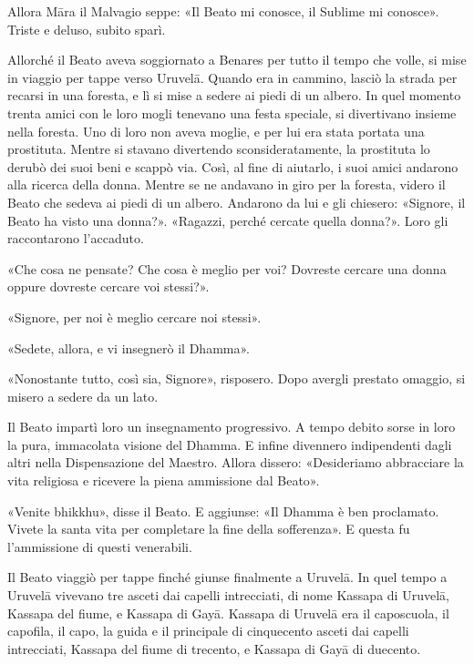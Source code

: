 Allora Māra il Malvagio seppe: «Il Beato mi conosce, il Sublime mi conosce».
Triste e deluso, subito sparì.

Allorché il Beato aveva soggiornato a Benares per tutto il tempo che volle, si
mise in viaggio per tappe verso Uruvelā. Quando era in cammino, lasciò la strada
per recarsi in una foresta, e lì si mise a sedere ai piedi di un albero. In quel
momento trenta amici con le loro mogli tenevano una festa speciale, si
divertivano insieme nella foresta. Uno di loro non aveva moglie, e per lui era
stata portata una prostituta. Mentre si stavano divertendo sconsideratamente, la
prostituta lo derubò dei suoi beni e scappò via. Così, al fine di aiutarlo, i
suoi amici andarono alla ricerca della donna. Mentre se ne andavano in giro per
la foresta, videro il Beato che sedeva ai piedi di un albero. Andarono da lui e
gli chiesero: «Signore, il Beato ha visto una donna?». «Ragazzi, perché cercate
quella donna?». Loro gli raccontarono l’accaduto.

«Che cosa ne pensate? Che cosa è meglio per voi? Dovreste cercare una donna
oppure dovreste cercare voi stessi?».

«Signore, per noi è meglio cercare noi stessi».

«Sedete, allora, e vi insegnerò il Dhamma».

«Nonostante tutto, così sia, Signore», risposero. Dopo avergli prestato omaggio,
si misero a sedere da un lato.

Il Beato impartì loro un insegnamento progressivo. A tempo debito sorse in loro
la pura, immacolata visione del Dhamma. E infine divennero indipendenti dagli
altri nella Dispensazione del Maestro. Allora dissero: «Desideriamo abbracciare
la vita religiosa e ricevere la piena ammissione dal Beato».

«Venite bhikkhu», disse il Beato. E aggiunse: «Il Dhamma è ben proclamato.
Vivete la santa vita per completare la fine della sofferenza». E questa fu
l’ammissione di questi venerabili.

Il Beato viaggiò per tappe finché giunse finalmente a Uruvelā. In quel tempo a
Uruvelā vivevano tre asceti dai capelli intrecciati, di nome Kassapa di Uruvelā,
Kassapa del fiume, e Kassapa di Gayā. Kassapa di Uruvelā era il caposcuola, il
capofila, il capo, la guida e il principale di cinquecento asceti dai capelli
intrecciati, Kassapa del fiume di trecento, e Kassapa di Gayā di duecento.

